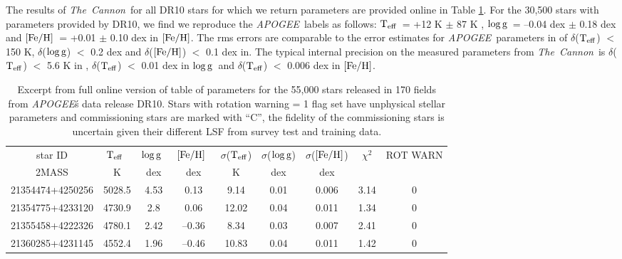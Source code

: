 \documentclass[12pt, preprint]{aastex}
\newcommand{\teff}{\mbox{$\rm T_{eff}$}}
\newcommand{\feh}{\mbox{$\rm [Fe/H]$}}
\newcommand{\logg}{\mbox{$\rm \log g$}}
\newcommand{\tc}{\textsl{The~Cannon}}
\newcommand{\apogee}{\textsl{APOGEE}}
\begin{document}
The results of \tc\ for all DR10 stars for which we return parameters are provided online in Table \ref{tab:online}. For the 30,500 stars with parameters provided by DR10, we find we reproduce the \apogee\ labels as follows: \teff\ = +12 K $\pm$ 87 K ,  \logg\ = --0.04 dex $\pm$  0.18 dex and \feh\ = +0.01 $\pm$ 0.10 dex in \feh. The rms errors are comparable to the error estimates for \apogee\ parameters in \citet{Meszaros2013} of $\delta$(\teff) $<$ 150 K, $\delta$(\logg) $<$  0.2 dex and $\delta$(\feh) $<$  0.1 dex in.  The typical internal precision on the measured parameters from \tc\ is  $\delta$(\teff) $<$ 5.6 K in ,  $\delta$(\teff) $<$ 0.01 dex in \logg\ and  $\delta$(\teff) $<$ 0.006 dex in \feh.


\begin{table}[!h]
\small{
\centering
\caption{Excerpt from full online version of table of parameters for the 55,000 stars released in 170 fields from \apogee\'s data release DR10. Stars with rotation warning = 1 flag set have unphysical stellar parameters and commissioning stars are marked with ``C'', the fidelity of the commissioning stars is uncertain given their different LSF from survey test and training data.} \begin{tabular}{| c | c | c |  c | c | c |  c | c | c |} %
\hline
star ID & \teff\ & \logg\ & \feh\ & $\sigma$(\teff) & $\sigma$(\logg) & $\sigma$(\feh) & $\chi^2$ & \tiny{ROT WARN}\\
{2MASS} &  K &  dex  & dex & K & dex & dex & & \\    
\hline
21354474+4250256 & 5028.5 & 4.53 & 0.13 & 9.14 & 0.01 & 0.006 & 3.14 & 0\\
21354775+4233120 & 4730.9 & 2.8 & 0.06 & 12.02 & 0.04 & 0.011 & 1.34 & 0\\
21355458+4222326 & 4780.1 & 2.42 & --0.36 & 8.34 & 0.03 & 0.007 & 2.41 & 0\\
21360285+4231145 &  4552.4 &  1.96 & --0.46  & 10.83 & 0.04 & 0.011 &  1.42 &  0\\
 \hline
\end{tabular}
\label{tab:online} }
\end{table}  
 
\end{document}
